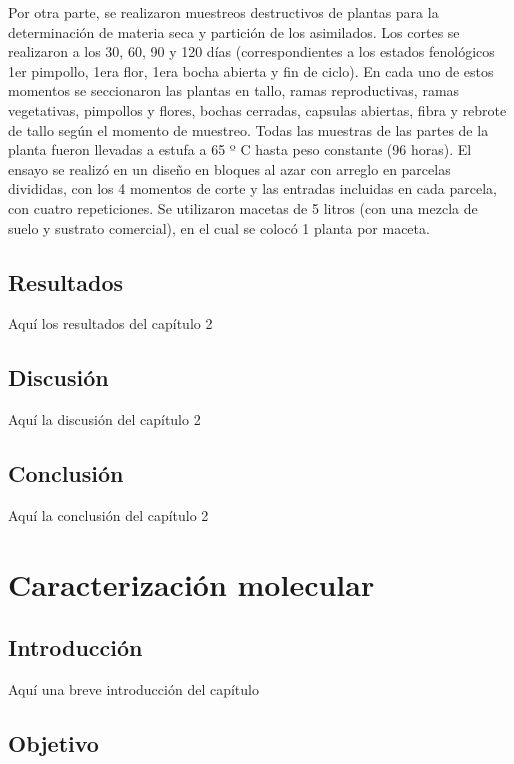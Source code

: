 \documentclass[12pt,oneside]{reedthesis}
\begin{document}
Por otra parte, se realizaron muestreos destructivos de plantas para la determinación de materia seca y partición de los asimilados. Los cortes se realizaron a los 30, 60, 90 y 120 días (correspondientes a los estados fenológicos 1er pimpollo, 1era flor, 1era bocha abierta y fin de ciclo). En cada uno de estos momentos se seccionaron las plantas en tallo, ramas reproductivas, ramas vegetativas, pimpollos y flores, bochas cerradas, capsulas abiertas, fibra y rebrote de tallo según el momento de muestreo. Todas las muestras de las partes de la planta fueron llevadas a estufa a 65 º C hasta peso constante (96 horas). El ensayo se realizó en un diseño en bloques al azar con arreglo en parcelas divididas, con los 4 momentos de corte y las entradas incluidas en cada parcela, con cuatro repeticiones. Se utilizaron macetas de 5 litros (con una mezcla de suelo y sustrato comercial), en el cual se colocó 1 planta por maceta.

\section{Resultados}\label{resultados-1}

Aquí los resultados del capítulo 2

\section{Discusión}\label{discusiuxf3n-1}

Aquí la discusión del capítulo 2

\section{Conclusión}\label{conclusiuxf3n-1}

Aquí la conclusión del capítulo 2

\chapter{Caracterización molecular}\label{ref-labels}

\section{Introducción}\label{introducciuxf3n-3}

Aquí una breve introducción del capítulo

\section{Objetivo}\label{objetivo-2}
\end{document}
